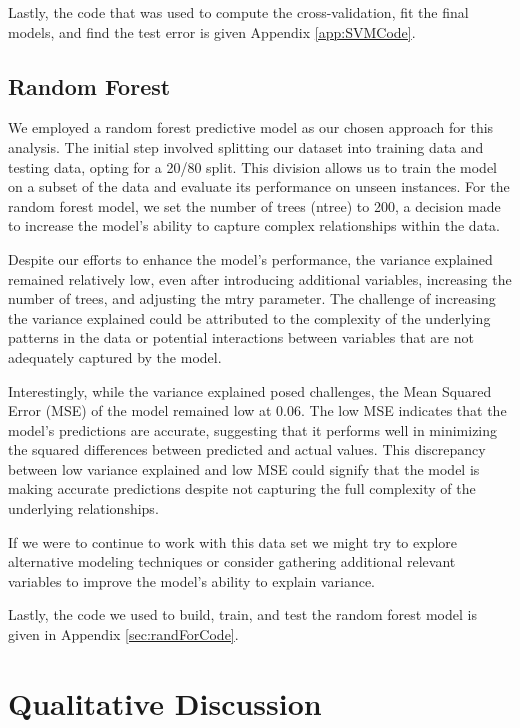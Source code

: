 \documentclass{article}
\begin{document}
    Lastly, the code that was used to compute the cross-validation, fit the final models, and find the test error is given  Appendix \ref{app:SVMCode}.
	

    \subsection{Random Forest}
    \hspace{\parindent} 

We employed a random forest predictive model as our chosen approach for this analysis. The initial step involved splitting our dataset into training data and testing data, opting for a 20/80 split. This division allows us to train the model on a subset of the data and evaluate its performance on unseen instances. For the random forest model, we set the number of trees (ntree) to 200, a decision made to increase the model's ability to capture complex relationships within the data.

Despite our efforts to enhance the model's performance, the variance explained remained relatively low, even after introducing additional variables, increasing the number of trees, and adjusting the mtry parameter. The challenge of increasing the variance explained could be attributed to the complexity of the underlying patterns in the data or potential interactions between variables that are not adequately captured by the model.

Interestingly, while the variance explained posed challenges, the Mean Squared Error (MSE) of the model remained low at 0.06. The low MSE indicates that the model's predictions are accurate, suggesting that it performs well in minimizing the squared differences between predicted and actual values. This discrepancy between low variance explained and low MSE could signify that the model is making accurate predictions despite not capturing the full complexity of the underlying relationships.

If we were to continue to work with this data set we might try to explore alternative modeling techniques  or consider gathering additional relevant variables to improve the model's ability to explain variance. 

Lastly, the code we used to build, train, and test the random forest model is given in Appendix \ref{sec:randForCode}. 


    
\section{Qualitative Discussion}
\hspace{\parindent} 
	
\end{document}
